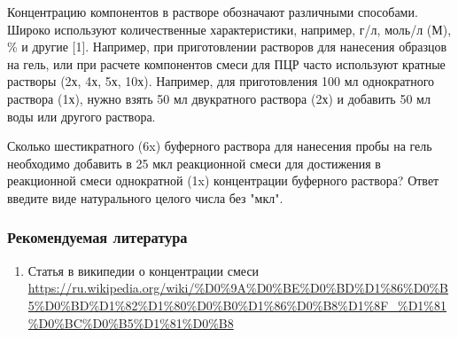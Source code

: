 
Концентрацию компонентов в растворе обозначают различными способами. Широко используют 
количественные характеристики, например, г/л, моль/л (М), \% и другие [1]. 
Например, при приготовлении растворов для нанесения образцов на гель, или при 
расчете компонентов смеси для ПЦР часто используют кратные растворы (2х, 4х, 5х, 10х). 
Например, для приготовления 100 мл однократного раствора (1х), нужно взять 50 мл двукратного раствора 
(2х) и добавить 50 мл воды или другого раствора.

Сколько шестикратного (6x) буферного раствора для нанесения пробы на гель необходимо добавить в 25 мкл реакционной смеси для достижения в реакционной смеси однократной (1x) концентрации буферного раствора? Ответ введите виде натурального целого числа без "мкл". 

\subsubsection*{Рекомендуемая литература}

\begin{enumerate}
    \item Статья в википедии о концентрации смеси \url{https://ru.wikipedia.org/wiki/%D0%9A%D0%BE%D0%BD%D1%86%D0%B5%D0%BD%D1%82%D1%80%D0%B0%D1%86%D0%B8%D1%8F_%D1%81%D0%BC%D0%B5%D1%81%D0%B8}
\end{enumerate}